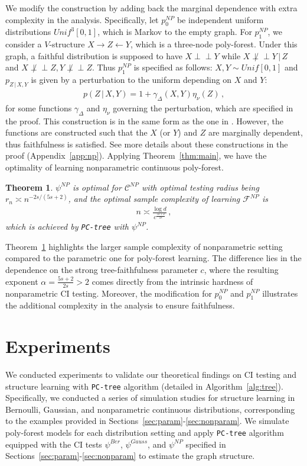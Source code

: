 \documentclass{article}
\newtheorem{theorem}{Theorem}[section]
\theoremstyle{definition}
\theoremstyle{definition}
\theoremstyle{definition}
\theoremstyle{definition}
\theoremstyle{definition}
\theoremstyle{definition}
\theoremstyle{remark}
\theoremstyle{remark}
\newcommand{\given}{\,|\,}
\newcommand{\indep}{\perp \!\!\! \perp }
\newcommand{\dd}{d}
\newcommand{\ciclass}{\mathcal{C}}
\newcommand{\pfclass}{\mathcal{F}}
\begin{document}
We modify the construction by adding back the marginal dependence with extra complexity in the analysis. Specifically, let $p_0^{NP}$ be independent uniform distributions $Unif^3[0,1]$, which is Markov to the empty graph. For $p_1^{NP}$, we consider a $V$-structure $X\rightarrow Z \leftarrow Y$, which is a three-node poly-forest. Under this graph, a faithful distribution is supposed to have $X\indep Y$ while $X\not\indep Y\given Z$ and $X\not\indep Z,Y\not\indep Z$.
Thus $p_1^{NP}$ is specified as follows: $X,Y\sim Unif[0,1]$ and $p_{Z\given X,Y}$ is given by a perturbation to the uniform depending on $X$ and $Y$:
\begin{align*}
    p(Z\given X,Y) = 1 + \gamma_{\Delta}(X,Y)\eta_{\nu}(Z) \,,
\end{align*}
for some functions $\gamma_{\Delta}$ and $\eta_{\nu}$ governing the perturbation, which are specified in the proof.
This construction is in the same form as the one in \citet{neykov2021minimax}. However, the functions are constructed such that the $X$ (or $Y$) and $Z$ are marginally dependent, thus faithfulness is satisfied.
See more details about these constructions in the proof (Appendix~\ref{app:np}). Applying Theorem~\ref{thm:main}, we have the optimality of learning nonparametric continuous poly-forest.
\begin{theorem}\label{thm:param:np}
    $\psi^{NP}$ is optimal for $\ciclass^{NP}$ with optimal testing radius being $r_n\asymp n^{-2s / (5s+2)}$, and the optimal sample complexity of learning $\pfclass^{NP}$ is
    \begin{align*}
        n \asymp \frac{\log\dd}{c^{\frac{5s+2}{2s}}} \,,
    \end{align*}
    which is achieved by \texttt{PC-tree} with $\psi^{NP}$.
\end{theorem}
Theorem~\ref{thm:param:np} highlights the larger sample complexity of nonparametric setting compared to the parametric one for poly-forest learning. The difference lies in the dependence on the strong tree-faithfulness parameter $c$, where the resulting exponent $\alpha = \frac{5s+2}{2s} > 2$ comes directly from the intrinsic hardness of nonparametric CI testing.
Moreover, the modification for $p_0^{NP}$ and $p_1^{NP}$ illustrates the additional complexity in the analysis to ensure faithfulness.






\section{Experiments}\label{sec:expt}
We conducted experiments to validate our theoretical findings on CI testing and structure learning with \texttt{PC-tree} algorithm (detailed in Algorithm~\ref{alg:tree}). 
Specifically, we conducted a series of simulation studies for structure learning in Bernoulli, Gaussian, and nonparametric continuous distributions, corresponding to the examples provided in Sections~\ref{sec:param}-\ref{sec:nonparam}. We simulate poly-forest models for each distribution setting and apply \texttt{PC-tree} algorithm equipped with the CI tests $\psi^{Ber}$, $\psi^{Gauss}$, and $\psi^{NP}$ specified in Sections~\ref{sec:param}-\ref{sec:nonparam} to estimate the graph structure.
\end{document}
